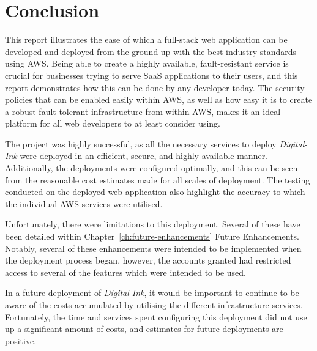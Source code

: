 \chapter{Conclusion}\label{ch:conclusion}
This report illustrates the ease of which a full-stack web application can be developed and deployed from the
ground up with the best industry standards using AWS\@.
Being able to create a highly available, fault-resistant service is crucial for businesses trying to serve SaaS
applications to their users, and this report demonstrates how this can be done by any developer today.
The security policies that can be enabled easily within AWS, as well as how easy it is to create a robust fault-tolerant
infrastructure from within AWS, makes it an ideal platform for all web developers to at least consider using.

The project was highly successful, as all the necessary services to deploy \textit{Digital-Ink} were deployed in an
efficient, secure, and highly-available manner.
Additionally, the deployments were configured optimally, and this can be seen from the reasonable cost estimates made
for all scales of deployment.
The testing conducted on the deployed web application also highlight the accuracy to which the individual AWS services
were utilised.

Unfortunately, there were limitations to this deployment.
Several of these have been detailed within Chapter~\ref{ch:future-enhancements} Future Enhancements.
Notably, several of these enhancements were intended to be implemented when the deployment process began, however, the
accounts granted had restricted access to several of the features which were intended to be used.

In a future deployment of \textit{Digital-Ink}, it would be important to continue to be aware of the costs accumulated
by utilising the different infrastructure services.
Fortunately, the time and services spent configuring this deployment did not use up a significant amount of costs, and
estimates for future deployments are positive.
